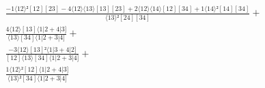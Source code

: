 \documentclass[varwidth, border=5pt]{standalone}
\begin{document}
\begin{my}
$\begin{gathered}
\scriptscriptstyle\frac{-1⟨12⟩²[12][23]-4⟨12⟩⟨13⟩[13][23]+2⟨12⟩⟨14⟩[12][34]+1⟨14⟩²[14][34]}{⟨13⟩²[24][34]} +\\
\scriptscriptstyle\frac{4⟨12⟩[13]⟨1|2+4|3]}{⟨13⟩[34]⟨1|2+3|4]} +\\
\scriptscriptstyle\frac{-3⟨12⟩[13]²⟨1|3+4|2]}{[12]⟨13⟩[34]⟨1|2+3|4]} +\\
\scriptscriptstyle\frac{1⟨12⟩²[12]⟨1|2+4|3]}{⟨13⟩²[34]⟨1|2+3|4]} \phantom{+}
\end{gathered}$
\end{my}
\end{document}
